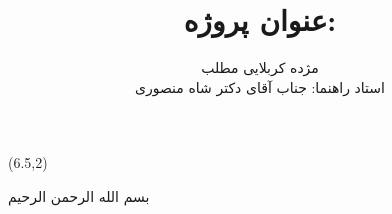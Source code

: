 \documentclass[11pt, a4paper]{article}
\title{
 عنوان پروژه:
\\
\lr{Open Ran in 5G}
}
\author{\textsc{مژده کربلایی مطلب} %
\\{استاد راهنما: جناب آقای دکتر شاه منصوری}
}
\begin{document}
\begin{textblock}{6}(6.5,2)
\noindent\Large
    \nastaliqfont
    \begin{huge}
    بسم الله الرحمن الرحیم
    \end{huge}

\thispagestyle{empty}
\end{textblock}
\maketitle
\newpage
\tableofcontents{}
\newpage
\listoffigures

\newpage


\newpage
{
\onehalfspacing


}

 
\end{document}
